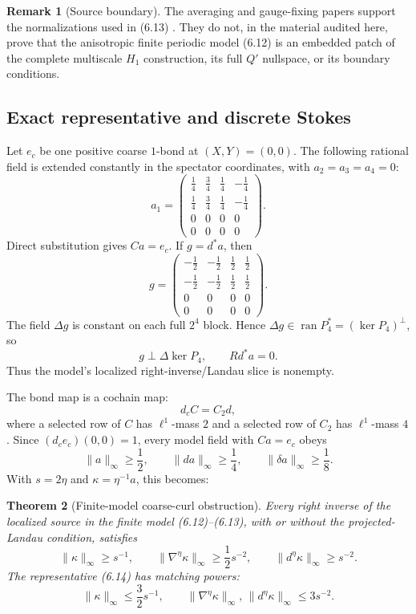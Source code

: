 \documentclass[11pt]{article}
\newtheorem{theorem}{Theorem}[section]
\theoremstyle{definition}
\newtheorem{remark}[theorem]{Remark}
\begin{document}
\begin{remark}[Source boundary]
The averaging and gauge-fixing papers support the normalizations used in
(6.13) \cite{balaban1985averaging,balaban1985gaugefixing}.  They do not,
in the material audited here, prove that the anisotropic finite periodic
model (6.12) is an embedded patch of the complete multiscale \(H_1\)
construction, its full \(Q'\) nullspace, or its boundary conditions.
\end{remark}

\subsection{Exact representative and discrete Stokes}

Let \(e_c\) be one positive coarse \(1\)-bond at \((X,Y)=(0,0)\).
The following rational field is extended constantly in the spectator
coordinates, with \(a_2=a_3=a_4=0\):
\[
a_1=
\begin{pmatrix}
\frac14&\frac34&\frac14&-\frac14\\
\frac14&\frac34&\frac14&-\frac14\\
0&0&0&0\\
0&0&0&0
\end{pmatrix}.
\tag{6.14}
\]
Direct substitution gives \(Ca=e_c\).  If \(g=d^*a\), then
\[
g=
\begin{pmatrix}
-\frac12&-\frac12&\frac12&\frac12\\
-\frac12&-\frac12&\frac12&\frac12\\
0&0&0&0\\
0&0&0&0
\end{pmatrix}.
\tag{6.15}
\]
The field \(\Delta g\) is constant on each full \(2^4\) block.  Hence
\(\Delta g\in\operatorname{ran}P_4^*=(\ker P_4)^\perp\), so
\[
g\perp\Delta\ker P_4,
\qquad
Rd^*a=0.
\tag{6.16}
\]
Thus the model's localized right-inverse/Landau slice is nonempty.

The bond map is a cochain map:
\[
d_cC=C_2d,
\tag{6.17}
\]
where a selected row of \(C\) has \(\ell^1\)-mass \(2\) and a selected row
of \(C_2\) has \(\ell^1\)-mass \(4\).  Since
\((d_ce_c)(0,0)=1\), every model field with \(Ca=e_c\) obeys
\[
\|a\|_\infty\ge\frac12,
\qquad
\|da\|_\infty\ge\frac14,
\qquad
\|\delta a\|_\infty\ge\frac18.
\tag{6.18}
\]
With \(s=2\eta\) and \(\kappa=\eta^{-1}a\), this becomes:

\begin{theorem}[Finite-model coarse-curl obstruction]
\label{thm:stokes}
Every right inverse of the localized source in the finite model
(6.12)--(6.13), with or without the projected-Landau condition, satisfies
\[
\boxed{
\|\kappa\|_\infty\ge s^{-1},
\qquad
\|\nabla^\eta\kappa\|_\infty\ge\frac12s^{-2},
\qquad
\|d^\eta\kappa\|_\infty\ge s^{-2}.
}
\tag{6.19}
\]
The representative (6.14) has matching powers:
\[
\|\kappa\|_\infty\le\frac32s^{-1},
\qquad
\|\nabla^\eta\kappa\|_\infty,\,
\|d^\eta\kappa\|_\infty\le3s^{-2}.
\tag{6.20}
\]
\end{theorem}
\end{document}
